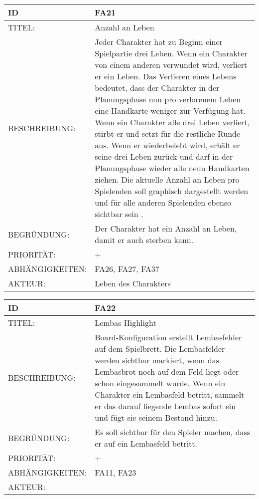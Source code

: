 \documentclass{uulm-assignment}
\begin{document}
    \begin{tabularx}{\textwidth}{|l|X |} \hline
        \textbf{ID} & \textbf{FA21} \\
        \hline
        TITEL: & Anzahl an Leben \\
        \hline
        BESCHREIBUNG: & Jeder Charakter hat zu Beginn einer Spielpartie drei Leben. Wenn ein Charakter von einem anderen
verwundet wird, verliert er ein Leben. Das Verlieren eines Lebens bedeutet, dass der Charakter in der Planungsphase nun pro verlorenem Leben eine Handkarte weniger zur Verfügung hat.
\newline Wenn ein Charakter alle drei Leben verliert, stirbt er und setzt für die restliche Runde aus. Wenn er wiederbelebt wird, erhält er seine drei Leben zurück und darf in der Planungsphase wieder alle neun Handkarten ziehen.
\newline Die aktuelle Anzahl an Leben pro Spielenden soll graphisch dargestellt werden und für alle anderen Spielenden ebenso sichtbar sein .
        \\
        \hline
        BEGRÜNDUNG: & Der Charakter hat ein Anzahl an Leben, damit er auch sterben kann.\\
        \hline
        PRIORITÄT: & +\\
        \hline
        ABHÄNGIGKEITEN: &  FA26, FA27, FA37\\
        \hline
        AKTEUR: & Leben des Charakters\\
        \hline
    \end{tabularx}
    
    \begin{tabularx}{\textwidth}{|l|X |} \hline
        \textbf{ID} & \textbf{FA22} \\
        \hline
        TITEL: &  Lembas Highlight\\
        \hline
        BESCHREIBUNG: & Board-Konfiguration erstellt Lembasfelder auf dem Spielbrett. Die Lembasfelder werden sichtbar markiert, wenn das Lembasbrot noch auf dem Feld liegt oder schon eingesammelt wurde.  Wenn ein Charakter ein Lembasfeld betritt, sammelt er das darauf liegende Lembas sofort ein und fügt sie seinem Bestand hinzu.
        \\
        \hline
        BEGRÜNDUNG: & Es soll sichtbar für den Spieler machen, dass er auf ein Lembasfeld betritt.\\
        \hline
        PRIORITÄT: & +\\
        \hline
        ABHÄNGIGKEITEN: & FA11, FA23 \\
        \hline
        AKTEUR: & \\
        \hline
    \end{tabularx}
    
\end{document}
